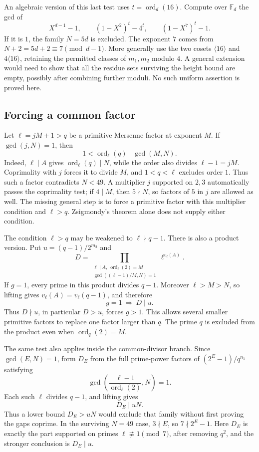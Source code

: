 \documentclass[11pt]{article}
\begin{document}
An algebraic version of this last test uses $t=\operatorname{ord}_d(16)$.
Compute over $\mathbb F_d$ the gcd of
\[
X^{d-1}-1,\qquad (1-X^2)^t-4^t,\qquad (1-X^7)^t-1.
\]
If it is $1$, the family $N=5d$ is excluded. The exponent $7$ comes
from $N+2=5d+2\equiv7\pmod{d-1}$.
More generally use the two cosets $\langle16\rangle$ and
$4\langle16\rangle$, retaining the permitted classes of $m_1,m_2$
modulo $4$. A general extension would need to show that all the
residue sets surviving the height bound are empty, possibly after
combining further moduli. No such uniform assertion is proved here.

\subsection{Forcing a common factor}
\label{sec:forcing-common-factor}
Let $\ell=jM+1>q$ be a primitive Mersenne factor at exponent $M$.
If $\gcd(j,N)=1$, then
\[
1<\operatorname{ord}_\ell(q)\mid\gcd(M,N).
\]
Indeed, $\ell\mid A$ gives $\operatorname{ord}_\ell(q)\mid N$,
while the order also divides $\ell-1=jM$. Coprimality with $j$
forces it to divide $M$, and $1<q<\ell$ excludes order $1$.
Thus such a factor contradicts $N<49$. A multiplier $j$ supported
on $2,3$ automatically passes the coprimality test; if $4\mid M$,
then $5\nmid N$, so factors of $5$ in $j$ are allowed as well.
The missing general step is to force a primitive factor with this
multiplier condition and $\ell>q$. Zsigmondy's theorem alone does
not supply either condition.

The condition $\ell>q$ may be weakened to $\ell\nmid q-1$.
There is also a product version. Put $u=(q-1)/2^{m_2}$ and
\[
D=\prod_{\substack{\ell\mid A,\ \operatorname{ord}_\ell(2)=M\\
                    \gcd((\ell-1)/M,N)=1}}
       \ell^{v_\ell(A)}.
\]
If $g=1$, every prime in this product divides $q-1$.
Moreover $\ell>M>N$, so lifting gives
$v_\ell(A)=v_\ell(q-1)$, and therefore
\[
\boxed{g=1\ \Longrightarrow\ D\mid u.}
\]
Thus $D\nmid u$, in particular $D>u$, forces $g>1$.
This allows several smaller primitive factors to replace one factor
larger than $q$. The prime $q$ is excluded from the product even when
$\operatorname{ord}_q(2)=M$.

The same test also applies inside the common-divisor branch.
Since $\gcd(E,N)=1$, form $D_E$ from the full prime-power factors
of $(2^E-1)/q^{n_1}$ satisfying
\[
\gcd\left(\frac{\ell-1}{\operatorname{ord}_\ell(2)},N\right)=1.
\]
Each such $\ell$ divides $q-1$, and lifting gives
\[
\boxed{D_E\mid uN.}
\]
Thus a lower bound $D_E>uN$ would exclude that family without
first proving the gaps coprime. In the surviving $N=49$ case,
$3\nmid E$, so $7\nmid2^E-1$. Here $D_E$ is exactly the part
supported on primes $\ell\not\equiv1\pmod7$, after removing $q^2$,
and the stronger conclusion is $D_E\mid u$.
\end{document}
